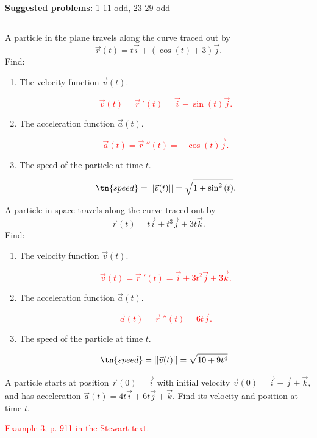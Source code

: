 \documentclass[12pt,reqno]{amsart}
\begin{document}
\textbf{Suggested problems:} 1-11 odd, 23-29 odd

\bigskip
\hrule

\bigskip
\prob A particle in the plane travels along the curve traced out by
	\[\vec{r}(t) = t\vec{i} + (\cos{(t)}+3)\vec{j}.
	\]
Find:

\medskip
\begin{enumerate}
\item The velocity function $\vec{v}(t)$.

\bigskip
\textcolor{red}{
	\[\vec{v}(t) = \vec{r} \ '(t) = \vec{i}-\sin{(t)}\vec{j}.
	\]}
\bigskip

\item The acceleration function $\vec{a}(t)$.

\bigskip
\textcolor{red}{
	\[\vec{a}(t) = \vec{r}\ ''(t) = -\cos{(t)}\vec{j}.
	\]}
\bigskip

\item The speed of the particle at time $t$.

\bigskip
\textcolor{red}{
	\[\tn{speed} = ||\vec{v}(t)|| = \sqrt{1 + \sin^2{(t)}}.
	\]}
\bigskip
\end{enumerate}

\bigskip
\prob A particle in space travels along the curve traced out by
	\[\vec{r}(t) = t\vec{i}+t^3\vec{j}+3t\vec{k}.
	\]
Find:

\medskip
\begin{enumerate}
\item The velocity function $\vec{v}(t)$.

\bigskip
\textcolor{red}{
	\[\vec{v}(t) = \vec{r}\ '(t) = \vec{i}+3t^2\vec{j}+3\vec{k}.
	\]}
\bigskip

\item The acceleration function $\vec{a}(t)$.

\bigskip
\textcolor{red}{
	\[\vec{a}(t) = \vec{r}\ ''(t) = 6t\vec{j}.
	\]}
\bigskip

\item The speed of the particle at time $t$.

\bigskip
\textcolor{red}{
	\[\tn{speed} = ||\vec{v}(t)|| = \sqrt{10+9t^4}.
	\]}
\bigskip
\end{enumerate}

\bigskip
\prob A particle starts at position $\vec{r}(0)=\vec{i}$ with initial velocity $\vec{v}(0) = \vec{i}-\vec{j}+\vec{k}$, and has acceleration $\vec{a}(t) = 4t\vec{i}+6t\vec{j}+\vec{k}$. Find its velocity and position at time $t$.

\bigskip
\textcolor{red}{Example 3, p. 911 in the Stewart text.}
\bigskip
\end{document}
